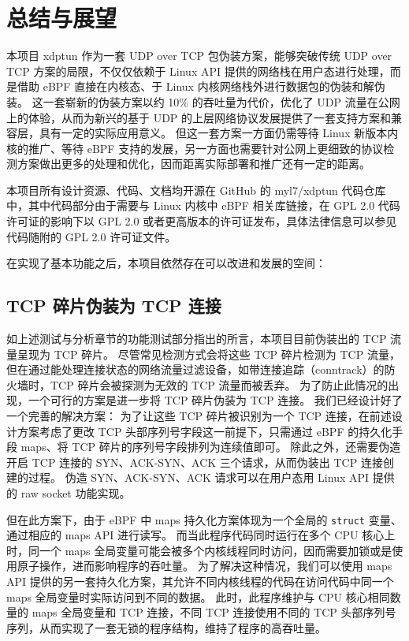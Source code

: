 

\chapter{总结与展望}

本项目 xdptun 作为一套 UDP over TCP 包伪装方案，能够突破传统 UDP over TCP 方案的局限，不仅仅依赖于 Linux API 提供的网络栈在用户态进行处理，而是借助 eBPF
直接在内核态、于 Linux 内核网络栈外进行数据包的伪装和解伪装。
这一套崭新的伪装方案以约 10\% 的吞吐量为代价，优化了 UDP 流量在公网上的体验，从而为新兴的基于 UDP 的上层网络协议发展提供了一套支持方案和兼容层，具有一定的实际应用意义。
但这一套方案一方面仍需等待 Linux 新版本内核的推广、等待 eBPF 支持的发展，另一方面也需要针对公网上更细致的协议检测方案做出更多的处理和优化，因而距离实际部署和推广还有一定的距离。

本项目所有设计资源、代码、文档均开源在 GitHub 的 myl7/xdptun 代码仓库中，其中代码部分由于需要与 Linux 内核中 eBPF 相关库链接，在 GPL 2.0 代码许可证的影响下以 GPL 2.0 或者更高版本的许可证发布，具体法律信息可以参见代码随附的 GPL 2.0 许可证文件。

在实现了基本功能之后，本项目依然存在可以改进和发展的空间：

\section{TCP 碎片伪装为 TCP 连接}

如上述测试与分析章节的功能测试部分指出的所言，本项目目前伪装出的 TCP 流量呈现为 TCP 碎片。
尽管常见检测方式会将这些 TCP 碎片检测为 TCP 流量，但在通过能处理连接状态的网络流量过滤设备，如带连接追踪（conntrack）的防火墙时，TCP 碎片会被探测为无效的 TCP 流量而被丢弃。
为了防止此情况的出现，一个可行的方案是进一步将 TCP 碎片伪装为 TCP 连接。
我们已经设计好了一个完善的解决方案：
为了让这些 TCP 碎片被识别为一个 TCP 连接，在前述设计方案考虑了更改 TCP 头部序列号字段这一前提下，只需通过 eBPF 的持久化手段 maps、将 TCP 碎片的序列号字段排列为连续值即可。
除此之外，还需要伪造开启 TCP 连接的 SYN、ACK-SYN、ACK 三个请求，从而伪装出 TCP 连接创建的过程。
伪造 SYN、ACK-SYN、ACK 请求可以在用户态用 Linux API 提供的 raw socket 功能实现。

但在此方案下，由于 eBPF 中 maps 持久化方案体现为一个全局的 \texttt{struct} 变量、通过相应的 maps API 进行读写。
而当此程序代码同时运行在多个 CPU 核心上时，同一个 maps 全局变量可能会被多个内核线程同时访问，因而需要加锁或是使用原子操作，进而影响程序的吞吐量。
为了解决这种情况，我们可以使用 maps API 提供的另一套持久化方案，其允许不同内核线程的代码在访问代码中同一个 maps 全局变量时实际访问到不同的数据。
此时，此程序维护与 CPU 核心相同数量的 maps 全局变量和 TCP 连接，不同 TCP 连接使用不同的 TCP 头部序列号序列，从而实现了一套无锁的程序结构，维持了程序的高吞吐量。

